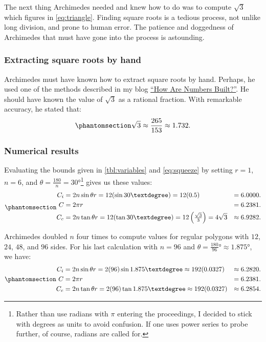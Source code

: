 \documentclass[
  a4paper,
]{article}
\begin{document}
The next thing Archimedes needed and knew how to do was to compute
\(\sqrt{3}\) which figures in \cref{eq:triangle}. Finding square roots
is a tedious process, not unlike long division, and prone to human
error. The patience and doggedness of Archimedes that must have gone
into the process is astounding.

\subsubsection{Extracting square roots by
hand}\label{extracting-square-roots-by-hand}

Archimedes must have known how to extract square roots by hand. Perhaps,
he used one of the methods described in my blog
\href{https://swanlotus.netlify.app/blogs/how-are-numbers-built}{``How
Are Numbers Built?''}. He should have known the value of \(\sqrt{3}\) as
a rational fraction. With remarkable accuracy, he stated that:
\begin{equation}\phantomsection\label{eq:sqrt3}{\sqrt{3} \approx \frac{265}{153} \approx 1.732.
}\end{equation}

\subsubsection{Numerical results}\label{numerical-results}

Evaluating the bounds given in \cref{tbl:variables} and
\cref{eq:squeeze} by setting \(r = 1\), \(n = 6\), and
\(\theta = \frac{180}{n} = 30°\)\footnote{Rather than use radians with
  \(\pi\) entering the proceedings, I decided to stick with degrees as
  units to avoid confusion. If one uses power series to probe further,
  of course, radians are called for.} gives us these values:
\begin{equation}\phantomsection\label{eq:triple-6}{
\begin{aligned}
C_i &= 2n\sin\theta r = 12(\sin 30°) = 12(0.5) &= 6.0000.\\
C &= 2\pi r &= 6.2381.\\
C_c &= 2n\tan\theta r = 12(\tan 30°) = 12\left(\tfrac{\sqrt{3}}{3}\right) = 4\sqrt{3} &\approx 6.9282.\\
\end{aligned}
}\end{equation}

Archimedes doubled \(n\) four times to compute values for regular
polygons with \(12\), \(24\), \(48\), and \(96\) sides. For his last
calculation with \(n = 96\) and
\(\theta = \tfrac{180}{96}° \approx 1.875°\), we have:
\begin{equation}\phantomsection\label{eq:triple-96}{
\begin{aligned}
C_i &= 2n\sin\theta r = 2(96)\sin{1.875°} \approx 192(0.0327) &\approx 6.2820.\\
C &= 2\pi r &= 6.2381.\\
C_c &= 2n\tan\theta r = 2(96)\tan{1.875°} \approx 192(0.0327) &\approx 6.2854.\\
\end{aligned}
}\end{equation}
\end{document}

